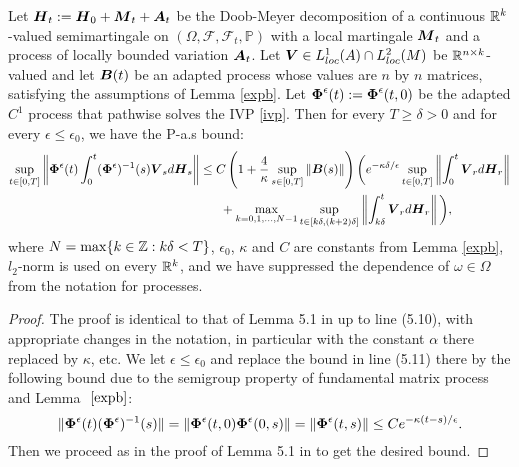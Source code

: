 \begin{lemma} \label{sib} Let $\boldsymbol{H}_{t} := \boldsymbol{H}_{0} + \boldsymbol{M}_{t} + \boldsymbol{A}_{t}$ be the Doob-Meyer decomposition of a continuous $\mathbb{R}^{k}$-valued semimartingale on $(\Omega, \mathcal{F}, \mathcal{F}_{t}, \mathbb{P})$ with a local martingale $\boldsymbol{M}_{t}$ and a process of locally bounded variation $\boldsymbol{A}_{t}$. Let $\boldsymbol{V} \in L_{loc}^{1}(A) \cap L_{loc}^2(M)$ be $\mathbb{R}^{n \times k}$-valued and let $\boldsymbol{B}(t)$ be an adapted process whose values are $n$ by $n$ matrices, satisfying the assumptions of Lemma \ref{expb}. Let $\boldsymbol{\Phi}^\epsilon(t) := \boldsymbol{\Phi}^\epsilon(t,0)$ be the adapted $C^{1}$ process that pathwise solves the IVP \eqref{ivp}. Then for every $T \geq \delta > 0$ and for every $\epsilon \leq \epsilon_{0}$, we have the P-a.s bound:
\begin{align}
\sup_{t \in [0,T]} \left\|\boldsymbol{\Phi}^\epsilon(t) \int_{0}^{t} (\boldsymbol{\Phi}^\epsilon)^{-1}(s) \boldsymbol{V}_{s} d\boldsymbol{H}_{s} \right\| &\leq C\left(1+\frac{4}{\kappa} \sup_{s \in [0,T]} \|\boldsymbol{B}(s)\| \right) \bigg(e^{-\kappa \delta/\epsilon} \sup_{t \in [0,T]} \left\| \int_{0}^{t} \boldsymbol{V}_{r} d\boldsymbol{H}_{r} \right\|  \nonumber \\ 
&\ \ \ \ \ + \max_{k=0,1,\dots,N-1} \sup_{t \in [k\delta, (k+2)\delta]} \left\| \int_{k\delta}^{t} \boldsymbol{V}_{r} d\boldsymbol{H}_{r} \right\| \bigg), 
\end{align}
 where $N = \max\{k \in \mathbb{Z}: k \delta < T\}$, $\epsilon_{0}$, $\kappa$ and $C$ are constants from Lemma \ref{expb}, $l_{2}$-norm is used on every $\mathbb{R}^{k}$, and we have suppressed the dependence of $\omega \in \Omega$ from the notation for processes.
\end{lemma}
\begin{proof}
The proof is  identical to that of Lemma 5.1 in \cite{birrell2017small} up to line (5.10), with appropriate changes in the notation, in particular with the constant $\alpha$ there replaced by $\kappa$, etc. We let $\epsilon \leq \epsilon_{0}$ and replace the bound in line (5.11) there by the following bound due to the semigroup property of fundamental matrix process and Lemma $~\ref{expb}$: \begin{equation}\|\boldsymbol{\Phi}^\epsilon(t) (\boldsymbol{\Phi}^\epsilon)^{-1}(s)\|= \|\boldsymbol{\Phi}^\epsilon(t,0) \boldsymbol{\Phi}^\epsilon(0,s)\| = \|\boldsymbol{\Phi}^\epsilon(t,s)\| \leq C e^{-\kappa(t-s)/\epsilon}.\end{equation} Then we proceed as in the proof of Lemma 5.1 in \cite{birrell2017small} to get the desired bound.
\end{proof}

